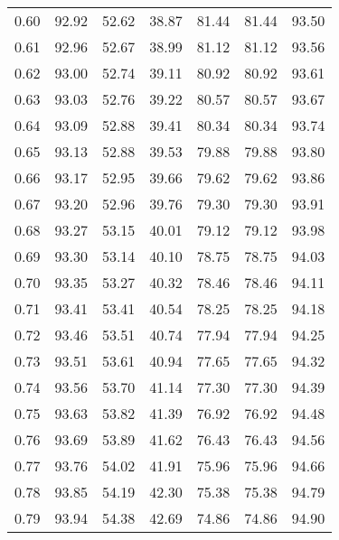 \begin{tabular}{|c|c|c|c|c|c|c|}
      0.60 &     92.92 &     52.62 &      38.87 &   81.44 &      81.44 &         93.50 \\
      0.61 &     92.96 &     52.67 &      38.99 &   81.12 &      81.12 &         93.56 \\
      0.62 &     93.00 &     52.74 &      39.11 &   80.92 &      80.92 &         93.61 \\
      0.63 &     93.03 &     52.76 &      39.22 &   80.57 &      80.57 &         93.67 \\
      0.64 &     93.09 &     52.88 &      39.41 &   80.34 &      80.34 &         93.74 \\
      0.65 &     93.13 &     52.88 &      39.53 &   79.88 &      79.88 &         93.80 \\
      0.66 &     93.17 &     52.95 &      39.66 &   79.62 &      79.62 &         93.86 \\
      0.67 &     93.20 &     52.96 &      39.76 &   79.30 &      79.30 &         93.91 \\
      0.68 &     93.27 &     53.15 &      40.01 &   79.12 &      79.12 &         93.98 \\
      0.69 &     93.30 &     53.14 &      40.10 &   78.75 &      78.75 &         94.03 \\
      0.70 &     93.35 &     53.27 &      40.32 &   78.46 &      78.46 &         94.11 \\
      0.71 &     93.41 &     53.41 &      40.54 &   78.25 &      78.25 &         94.18 \\
      0.72 &     93.46 &     53.51 &      40.74 &   77.94 &      77.94 &         94.25 \\
      0.73 &     93.51 &     53.61 &      40.94 &   77.65 &      77.65 &         94.32 \\
      0.74 &     93.56 &     53.70 &      41.14 &   77.30 &      77.30 &         94.39 \\
      0.75 &     93.63 &     53.82 &      41.39 &   76.92 &      76.92 &         94.48 \\
      0.76 &     93.69 &     53.89 &      41.62 &   76.43 &      76.43 &         94.56 \\
      0.77 &     93.76 &     54.02 &      41.91 &   75.96 &      75.96 &         94.66 \\
      0.78 &     93.85 &     54.19 &      42.30 &   75.38 &      75.38 &         94.79 \\
      0.79 &     93.94 &     54.38 &      42.69 &   74.86 &      74.86 &         94.90 \\

\end{tabular}
